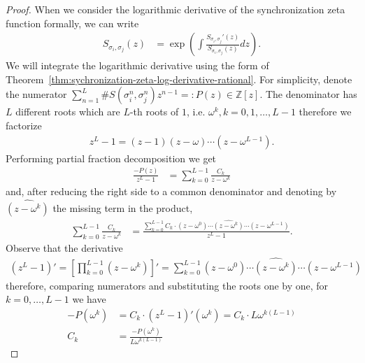 \documentclass[10pt,a4paper]{amsart}
\theoremstyle{plain}
\theoremstyle{definition}
\theoremstyle{remark}
\def\Z{\mathbb{Z}}
\begin{document}
\begin{proof}
  When we consider the logarithmic derivative of the synchronization zeta function formally, we can write
  \begin{align*}
    S_{\sigma_i, \sigma_j}(z) &= \exp \left( \int \frac{S_{\sigma_i, \sigma_j}'(z)}{S_{\sigma_i, \sigma_j}(z)} dz \right).
  \end{align*}
  We will integrate the logarithmic derivative using the form of Theorem~\ref{thm:sychronization-zeta-log-derivative-rational}.
  For simplicity, denote the numerator $\sum_{n=1}^{L} \#S(\sigma_i^n, \sigma_j^n) z^{n-1} =: P(z) \in \Z[z]$.
  The denominator has $L$ different roots which are $L$-th roots of $1$, i.e. $\omega^k, k=0,1,\ldots,L-1$
  therefore we factorize
  \begin{align*}
    z^L-1 = (z-1)(z-\omega)\cdots(z-\omega^{L-1}).
  \end{align*}
  Performing partial fraction decomposition we get
  \begin{align*}
    \frac{-P(z)}{z^L-1} &= \sum_{k=0}^{L-1} \frac{C_k}{z-\omega^k}
  \end{align*}
  and, after reducing the right side to a common denominator and denoting by $\widehat{(z-\omega^k)}$
  the missing term in the product,
  \begin{align*}
    \sum_{k=0}^{L-1} \frac{C_k}{z-\omega^k}
    &= \frac{\sum_{k=0}^{L-1} C_k \cdot (z-\omega^0) \cdots \widehat{(z-\omega^k)} \cdots (z-\omega^{L-1})}{z^L-1}.
  \end{align*}
  Observe that the derivative
  \begin{align*}
    (z^L-1)' = \left[ \prod_{k=0}^{L-1} (z-\omega^k) \right]'
      = \sum_{k=0}^{L-1} (z-\omega^0) \cdots \widehat{(z-\omega^k)} \cdots (z-\omega^{L-1})
  \end{align*}
  therefore, comparing numerators and substituting the roots one by one, for $k=0,\ldots,L-1$ we have
  \begin{align*}
    -P(\omega^k) &= C_k \cdot (z^L-1)'(\omega^k) = C_k \cdot L\omega^{k(L-1)} \\
    C_k &= \frac{-P(\omega^k)}{L\omega^{k(L-1)}}
  \end{align*}


\end{proof}
\end{document}
